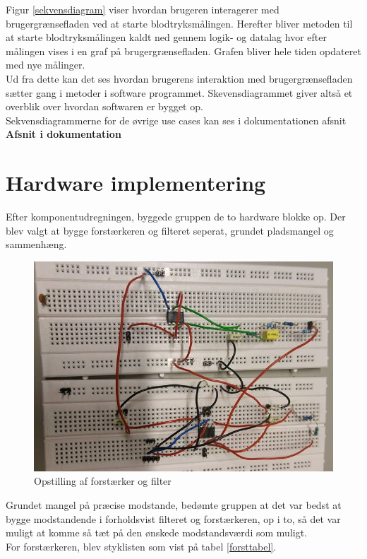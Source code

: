 Figur \ref{sekvensdiagram} viser hvordan brugeren interagerer med brugergrænsefladen ved at starte blodtryksmålingen. Herefter bliver metoden til at starte blodtryksmålingen kaldt ned gennem logik- og datalag hvor efter målingen vises i en graf på brugergrænsefladen. Grafen bliver hele tiden opdateret med nye målinger.\\
Ud fra dette kan det ses hvordan brugerens interaktion med brugergrænsefladen sætter gang i metoder i software programmet. Skevensdiagrammet giver altså et overblik over hvordan softwaren er bygget op.\\
Sekvensdiagrammerne for de øvrige use cases kan ses i dokumentationen afsnit \textbf{Afsnit i dokumentation}
  

\section{Hardware implementering}
\label{himpl}
Efter komponentudregningen, byggede gruppen de to hardware blokke op. Der blev valgt at bygge forstærkeren og filteret seperat, grundet pladsmangel og sammenhæng.\\

\begin{figure}[H]
	\centering
	\includegraphics[width=1\textwidth]{Figurer/Hardware/samletopstilling}
	\caption{Opstilling af forstærker og filter}
	\label{samletopbygning}
\end{figure}

Grundet mangel på præcise modstande, bedømte gruppen at det var bedst at bygge modstandende i forholdsvist filteret og forstærkeren, op i to, så det var muligt at komme så tæt på den ønskede modstandsværdi som muligt. \\
For forstærkeren, blev styklisten som vist på tabel \ref{forsttabel}.



